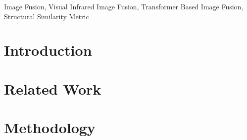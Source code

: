 \documentclass[conference]{IEEEtran}
\begin{document}
\begin{IEEEkeywords}
Image Fusion, Visual Infrared Image Fusion, Transformer Based Image Fusion, Structural Similarity Metric
\end{IEEEkeywords}


\section{Introduction}


\section{Related Work}


\section{Methodology}


 

\end{document}
